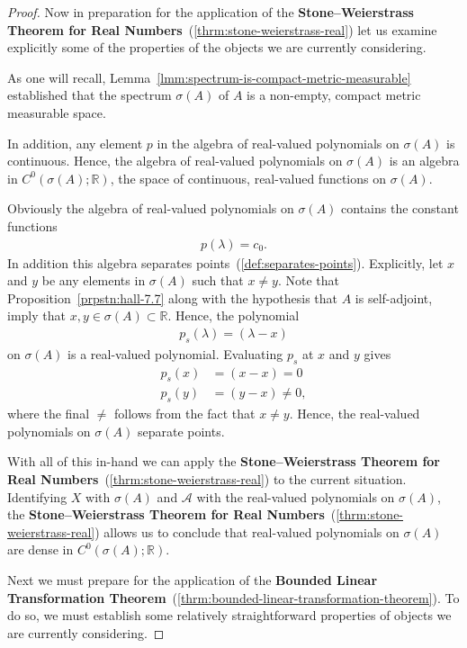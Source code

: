 \begin{proof}
Now in preparation for the application of the \textbf{Stone–Weierstrass Theorem for Real Numbers}~(\ref{thrm:stone-weierstrass-real}) let us examine explicitly some of the properties of the objects we are currently considering.

As one will recall, Lemma~\ref{lmm:spectrum-is-compact-metric-measurable} established that the spectrum $\sigma(A)$ of $A$ is a non-empty, compact metric measurable space.

In addition, any element $p$ in the algebra of real-valued polynomials on $\sigma(A)$ is continuous. Hence, the algebra of real-valued polynomials on $\sigma(A)$ is an algebra in $C^0(\sigma(A); \mathbb{R})$, the space of continuous, real-valued functions on $\sigma(A)$.

Obviously the algebra of real-valued polynomials on $\sigma(A)$ contains the constant functions
\begin{align}
    p(\lambda) = c_0.
\end{align}
In addition this algebra separates points~(\ref{def:separates-points}). Explicitly, let $x$ and $y$ be any elements in $\sigma(A)$ such that $x \neq y$. Note that Proposition~\ref{prpstn:hall-7.7} along with the hypothesis that $A$ is self-adjoint, imply that $x,y \in \sigma(A) \subset \mathbb{R}$. Hence, the polynomial
\begin{align}
    p_s(\lambda) = (\lambda - x)
\end{align}
on $\sigma(A)$ is a real-valued polynomial. Evaluating $p_s$ at $x$ and $y$ gives
\begin{align}
    p_s(x) &= (x - x) = 0 \\
    p_s(y) &= (y - x) \neq 0,
\end{align}
where the final $\neq$ follows from the fact that $x \neq y$. Hence, the real-valued polynomials on $\sigma(A)$ separate points.

With all of this in-hand we can apply the \textbf{Stone–Weierstrass Theorem for Real Numbers}~(\ref{thrm:stone-weierstrass-real}) to the current situation. Identifying $X$ with $\sigma(A)$ and $\mathcal{A}$ with the real-valued polynomials on $\sigma(A)$, the \textbf{Stone–Weierstrass Theorem for Real Numbers}~(\ref{thrm:stone-weierstrass-real}) allows us to conclude that real-valued polynomials on $\sigma(A)$ are dense in $C^0(\sigma(A); \mathbb{R})$.

Next we must prepare for the application of the \textbf{Bounded Linear Transformation Theorem}~(\ref{thrm:bounded-linear-transformation-theorem}). To do so, we must establish some relatively straightforward properties of objects we are currently considering. 


\end{proof}
